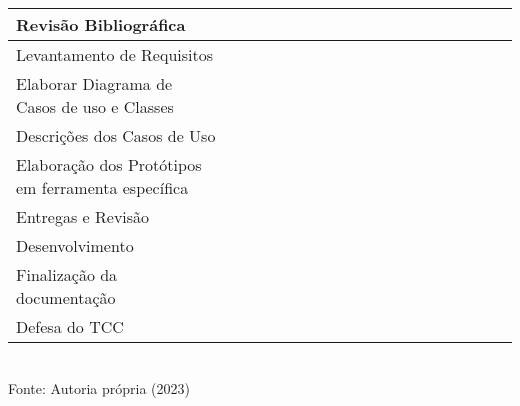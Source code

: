 \begin{quadro}[H]
\begin{center}
\begin{tabular}{|m{3.5cm}|m{.2cm}|m{.2cm}|m{.2cm}|m{.2cm}|m{.2cm}|m{.2cm}|m{.2cm}|m{.2cm}|m{.2cm}|m{.2cm}|m{.2cm}|m{.2cm}|m{.2cm}|m{.2cm}|m{.2cm}|m{.2cm}|m{.2cm}|m{.2cm}|}
			Revisão Bibliográfica & & & & & &  \cellcolor{gray!50} &\cellcolor{gray!50} &\cellcolor{gray!50} & \cellcolor{gray!50} & & & & & & & & & \\
			\hline
			Levantamento de Requisitos  & & & & & & &\cellcolor{gray!50} &\cellcolor{gray!50} &\cellcolor{gray!50}& & & & & & & & & \\
			\hline
			Elaborar Diagrama de Casos de uso e Classes  & & & & & & & & &\cellcolor{gray!50} &\cellcolor{gray!50} & & & & & & & & \\
			\hline
			Descrições dos Casos de Uso  & & & & & & & & &\cellcolor{gray!50} &\cellcolor{gray!50} & & & & & & & & \\
			\hline
			Elaboração dos Protótipos em ferramenta específica & & & & & & & & & &\cellcolor{gray!50} &\cellcolor{gray!50} &  \cellcolor{gray!50} & & & & & & \\
			\hline
			Entregas e Revisão & & & & & & & & & & & & & &\cellcolor{gray!50} &\cellcolor{gray!50} &\cellcolor{gray!50} & & \\ 
			\hline
			Desenvolvimento  & & & & & & &\cellcolor{gray!50} &\cellcolor{gray!50} &\cellcolor{gray!50} &\cellcolor{gray!50} &\cellcolor{gray!50} &\cellcolor{gray!50} &\cellcolor{gray!50} &\cellcolor{gray!50} &\cellcolor{gray!50} &\cellcolor{gray!50} &\cellcolor{gray!50} & \\
			\hline
			Finalização da documentação  & & & & & & & & & & & & & & & & &\cellcolor{gray!50} & \\
			\hline
			Defesa do TCC & & & & & & & & & & & & & & & & & &\cellcolor{gray!50} \\
			\hline
		\end{tabular}
		\vspace{0.5cm}	\\Fonte: Autoria própria (2023)
	\end{center}
\end{quadro}